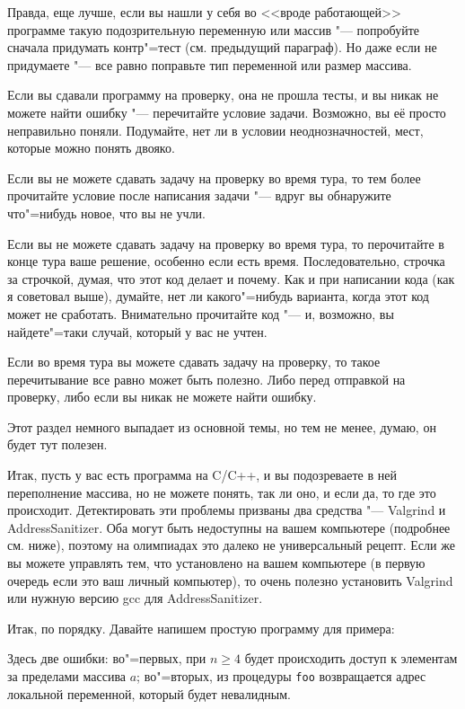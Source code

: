 \documentclass[a4paper,10pt]{problems}
\begin{document}
Правда, еще лучше, если вы нашли у себя во <<вроде работающей>> программе такую подозрительную переменную или массив "---
попробуйте сначала придумать контр"=тест (см. предыдущий параграф). Но даже если не придумаете "--- все равно поправьте тип переменной или размер массива.

Если вы сдавали программу на проверку, она не прошла тесты, и вы никак не можете найти ошибку "--- перечитайте условие задачи. 
Возможно, вы её просто неправильно поняли.
Подумайте, нет ли в условии неоднозначностей, мест, которые можно понять двояко.

Если вы не можете сдавать задачу на проверку во время тура, то тем более прочитайте условие после написания задачи "--- вдруг вы обнаружите что"=нибудь
новое, что вы не учли.

Если вы не можете сдавать задачу на проверку во время тура, то перочитайте в конце тура ваше решение, особенно если есть время. 
Последовательно, строчка за строчкой, думая, что этот код делает и почему. 
Как и при написании кода (как я советовал выше), думайте, нет ли какого"=нибудь варианта, когда этот код может не сработать.
Внимательно прочитайте код "--- и, возможно, вы найдете"=таки случай, который у вас не учтен.

Если во время тура вы можете сдавать задачу на проверку, то такое перечитывание все равно может быть полезно.
Либо перед отправкой на проверку, либо если вы никак не можете найти ошибку.

Этот раздел немного выпадает из основной темы, но тем не менее, думаю, он будет тут полезен.

Итак, пусть у вас есть программа на C/C++, и вы подозреваете в ней переполнение массива, но не можете понять, так ли оно, и если да, то где это происходит.
Детектировать эти проблемы призваны два средства "--- Valgrind и AddressSanitizer. 
Оба могут быть недоступны на вашем компьютере (подробнее см. ниже), поэтому на олимпиадах это далеко не универсальный рецепт.
Если же вы можете управлять тем, что установлено на вашем компьютере (в первую очередь если это ваш личный компьютер),
то очень полезно установить Valgrind или нужную версию gcc для AddressSanitizer.

Итак, по порядку. Давайте напишем простую программу для примера:


Здесь две ошибки: во"=первых, при $n\geq 4$ будет происходить доступ к элементам за пределами массива $a$; во"=вторых, 
из процедуры \verb`foo` возвращается адрес локальной переменной, который будет невалидным.
\end{document}
